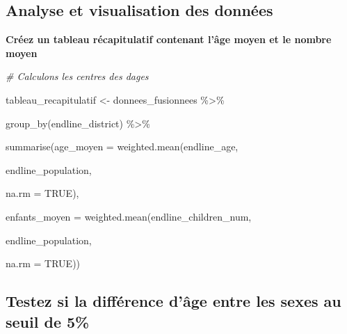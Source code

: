 \documentclass[
  14pt,
]{article}
\newenvironment{Shaded}{\begin{snugshade}}{\end{snugshade}}
\newcommand{\AttributeTok}[1]{\textcolor[rgb]{0.77,0.63,0.00}{#1}}
\newcommand{\CommentTok}[1]{\textcolor[rgb]{0.56,0.35,0.01}{\textit{#1}}}
\newcommand{\ConstantTok}[1]{\textcolor[rgb]{0.00,0.00,0.00}{#1}}
\newcommand{\FunctionTok}[1]{\textcolor[rgb]{0.00,0.00,0.00}{#1}}
\newcommand{\NormalTok}[1]{#1}
\newcommand{\OtherTok}[1]{\textcolor[rgb]{0.56,0.35,0.01}{#1}}
\newcommand{\SpecialCharTok}[1]{\textcolor[rgb]{0.00,0.00,0.00}{#1}}
\begin{document}
\hypertarget{analyse-et-visualisation-des-donnuxe9es}{%
\subsection{\texorpdfstring{\textbf{Analyse et visualisation des
données}\\
}{Analyse et visualisation des données }}\label{analyse-et-visualisation-des-donnuxe9es}}

\textbf{Créez un tableau récapitulatif contenant l'âge moyen et le
nombre moyen}\\

\begin{Shaded}
\begin{Highlighting}[]
\CommentTok{\# Calculons les centres des d\textquotesingle{}ages}

\NormalTok{tableau\_recapitulatif }\OtherTok{\textless{}{-}}\NormalTok{ donnees\_fusionnees }\SpecialCharTok{\%\textgreater{}\%}
  
  \FunctionTok{group\_by}\NormalTok{(endline\_district) }\SpecialCharTok{\%\textgreater{}\%}
  
  \FunctionTok{summarise}\NormalTok{(}\AttributeTok{age\_moyen =} \FunctionTok{weighted.mean}\NormalTok{(endline\_age,}
                                      
\NormalTok{                                      endline\_population, }
                                      
                                      \AttributeTok{na.rm =} \ConstantTok{TRUE}\NormalTok{),}
            
            \AttributeTok{enfants\_moyen =} \FunctionTok{weighted.mean}\NormalTok{(endline\_children\_num,}
                                          
\NormalTok{                                          endline\_population, }
                                          
                                          \AttributeTok{na.rm =} \ConstantTok{TRUE}\NormalTok{)) }
\end{Highlighting}
\end{Shaded}

\hypertarget{testez-si-la-diffuxe9rence-duxe2ge-entre-les-sexes-au-seuil-de-5}{%
\subsection{\texorpdfstring{\textbf{Testez si la différence d'âge entre
les sexes au seuil de 5\%}\\
}{Testez si la différence d'âge entre les sexes au seuil de 5\% }}\label{testez-si-la-diffuxe9rence-duxe2ge-entre-les-sexes-au-seuil-de-5}}
\end{document}
